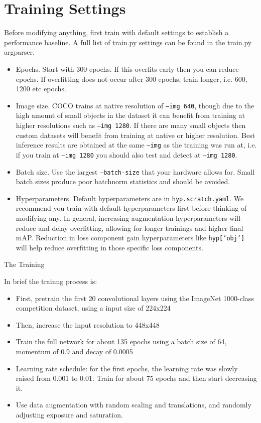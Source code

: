 \section{Training Settings}
Before modifying anything, first train with default settings to establish a performance baseline. A full list of train.py settings can be found in the train.py argparser.
\begin{itemize}
\item Epochs. Start with 300 epochs. If this overfits early then you can reduce epochs. If overfitting does not occur after 300 epochs, train longer, i.e. 600, 1200 etc epochs.
\item Image size. COCO trains at native resolution of \texttt{--img 640}, though due to the high amount of small objects in the dataset it can benefit from training at higher resolutions such as \texttt{--img 1280}. If there are many small objects then custom datasets will benefit from training at native or higher resolution. Best inference results are obtained at the same \texttt{--img} as the training was run at, i.e. if you train at \texttt{--img 1280} you should also test and detect at \texttt{--img 1280}.
\item Batch size. Use the largest \texttt{--batch-size} that your hardware allows for. Small batch sizes produce poor batchnorm statistics and should be avoided.
\item Hyperparameters. Default hyperparameters are in \texttt{hyp.scratch.yaml}. We recommend you train with default hyperparameters first before thinking of modifying any. In general, increasing augmentation hyperparameters will reduce and delay overfitting, allowing for longer trainings and higher final mAP. Reduction in loss component gain hyperparameters like \texttt{hyp['obj']} will help reduce overfitting in those specific loss components.
\end{itemize}


The Training

In brief the trainng process is:

\begin{itemize}
    \item First, pretrain the first 20 convolutional layers using the ImageNet 1000-class competition dataset, using a input size of 224x224
    \item Then, increase the input resolution to 448x448
    \item Train the full network for about 135 epochs using a batch size of 64, momentum of 0.9 and decay of 0.0005
    \item Learning rate schedule: for the first epochs, the learning rate was slowly raised from 0.001 to 0.01. Train for about 75 epochs and then start decreasing it.
    \item Use data augmentation with random scaling and translations, and randomly adjusting exposure and saturation.
\end{itemize}


